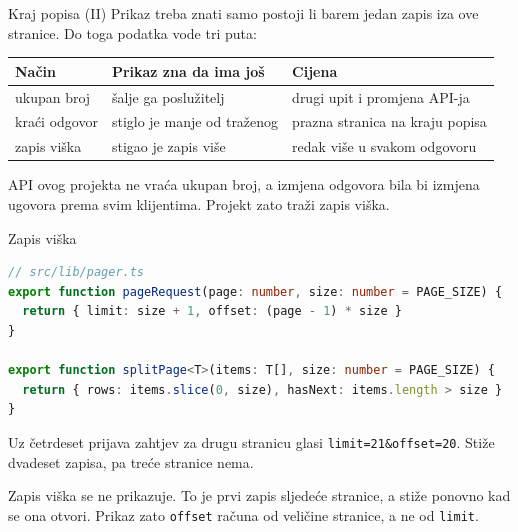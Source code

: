 \begin{frame}{Kraj popisa (II)}
Prikaz treba znati samo postoji li barem jedan zapis iza ove stranice. Do toga podatka vode tri puta:

\vspace{0.5em}
\begin{center}
{\small
\setlength{\tabcolsep}{6pt}
\renewcommand{\arraystretch}{1.35}
\begin{tabular}{@{}L{2.6cm}L{4.4cm}L{5.0cm}@{}}
  \toprule
  \textbf{Način} & \textbf{Prikaz zna da ima još} & \textbf{Cijena} \\
  \midrule
  ukupan broj & šalje ga poslužitelj & drugi upit i promjena API-ja \\
  kraći odgovor & stiglo je manje od traženog & prazna stranica na kraju popisa \\
  zapis viška & stigao je zapis više & redak više u svakom odgovoru \\
  \bottomrule
\end{tabular}
}
\end{center}

\vspace{0.5em}
\begin{konvencija}
API ovog projekta ne vraća ukupan broj, a izmjena odgovora bila bi izmjena ugovora prema svim klijentima. Projekt zato traži zapis viška.
\end{konvencija}
\end{frame}

\begin{frame}[fragile]{Zapis viška}
\begin{lstlisting}[language=typescript]
// src/lib/pager.ts
export function pageRequest(page: number, size: number = PAGE_SIZE) {
  return { limit: size + 1, offset: (page - 1) * size }
}

export function splitPage<T>(items: T[], size: number = PAGE_SIZE) {
  return { rows: items.slice(0, size), hasNext: items.length > size }
}
\end{lstlisting}

\vspace{0.3em}
Uz četrdeset prijava zahtjev za drugu stranicu glasi \texttt{limit=21\&offset=20}. Stiže dvadeset zapisa, pa treće stranice nema.

\vspace{0.3em}
Zapis viška se ne prikazuje. To je prvi zapis sljedeće stranice, a stiže ponovno kad se ona otvori. Prikaz zato \texttt{offset} računa od veličine stranice, a ne od \texttt{limit}.
\end{frame}

